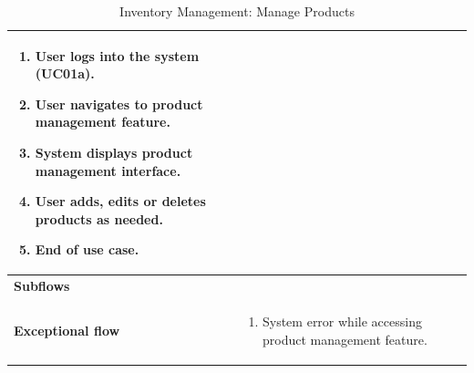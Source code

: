 \documentclass[../thesis.tex]{subfiles}
\begin{document}
\begin{center}
\begin{table}[H]
{\begin{tabular}[htbp]{|p{}|p{}|}
\begin{enumerate}
                                                       \item User logs into the system (UC01a).
                                                       \item  User navigates to product management feature.
                                                       \item System displays product management interface.
                                                       \item  User adds, edits or deletes products as needed.
                                                       \item End of use case.
                                                   \end{enumerate}           \\ \hline
                \textbf{Subflows              }  &                                                                 \\ \hline
                \textbf{Exceptional flow       } & \begin{enumerate}
                                                       \item System error while accessing product management feature.
                                                   \end{enumerate}   \\ \hline
            \end{tabular}%
        }
        \caption{Inventory Management: Manage Products}
        \label{tab:table-usecase-manage-products}


    \end{table}
\end{center}
\end{document}
